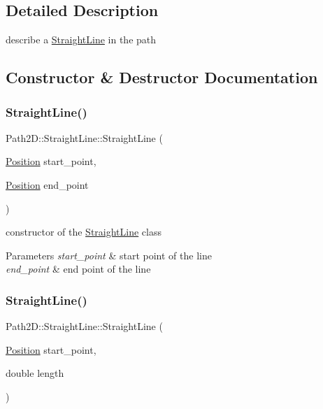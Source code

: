 \subsection{Detailed Description}
describe a \mbox{\hyperlink{class_path2_d_1_1_straight_line}{Straight\+Line}} in the path 

\subsection{Constructor \& Destructor Documentation}
\mbox{\label{class_path2_d_1_1_straight_line_af93144db1f27739f00be60bd4af99951}} 
\subsubsection{\texorpdfstring{Straight\+Line()}{StraightLine()}\hspace{0.1cm}{\footnotesize\ttfamily [1/2]}}
{\footnotesize\ttfamily Path2\+D\+::\+Straight\+Line\+::\+Straight\+Line (\begin{DoxyParamCaption}\item[{\mbox{\hyperlink{class_path2_d_1_1_position}{Position}}}]{start\+\_\+point,  }\item[{\mbox{\hyperlink{class_path2_d_1_1_position}{Position}}}]{end\+\_\+point }\end{DoxyParamCaption})}



constructor of the \mbox{\hyperlink{class_path2_d_1_1_straight_line}{Straight\+Line}} class 


\begin{DoxyParams}{Parameters}
{\em start\+\_\+point} & start point of the line \\
\hline
{\em end\+\_\+point} & end point of the line \\
\hline
\end{DoxyParams}
\mbox{\label{class_path2_d_1_1_straight_line_a5c7e7a686ab56de56c4a00f97bb86fd7}} 
\subsubsection{\texorpdfstring{Straight\+Line()}{StraightLine()}\hspace{0.1cm}{\footnotesize\ttfamily [2/2]}}
{\footnotesize\ttfamily Path2\+D\+::\+Straight\+Line\+::\+Straight\+Line (\begin{DoxyParamCaption}\item[{\mbox{\hyperlink{class_path2_d_1_1_position}{Position}}}]{start\+\_\+point,  }\item[{double}]{length }\end{DoxyParamCaption})}



